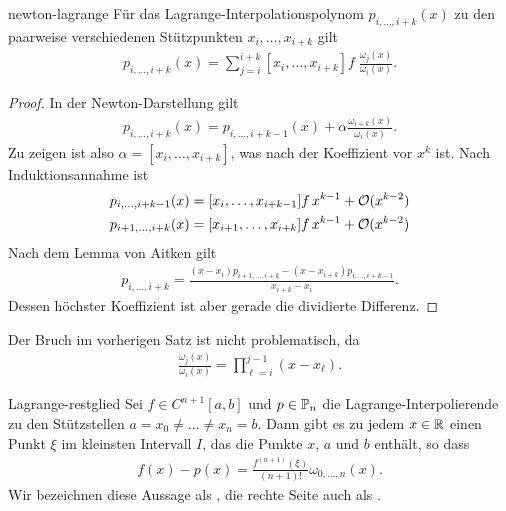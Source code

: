 \begin{Satz}{newton-lagrange}
  Für das Lagrange-Interpolationspolynom $p_{i,\dots,i+k}(x)$ zu den
  paarweise verschiedenen Stützpunkten $x_i,\dots,x_{i+k}$ gilt
  \begin{gather}
    p_{i,\dots,i+k}(x)
    = \sum_{j=i}^{i+k} [x_i,\dots,x_{i+k}]f\; \frac{\omega_j(x)}{\omega_i(x)}.
  \end{gather}
\end{Satz}

\begin{proof}
  In der Newton-Darstellung gilt
  \begin{gather}
    p_{i,\dots,i+k}(x) = p_{i,\dots,i+k-1}(x)
    + \alpha \frac{\omega_{i+k}(x)}{\omega_i(x)}.
  \end{gather}
  Zu zeigen ist also $\alpha = [x_i,\dots,x_{i+k}]$, was nach
   der Koeffizient vor $x^k$ ist. Nach
  Induktionsannahme ist
  \begin{gather}
    \begin{split}
      p_{i,\dots,i+k-1}(x) &= [x_i,\dots,x_{i+k-1}]f \,x^{k-1} +\bigo(x^{k-2})\\
      p_{i+1,\dots,i+k}(x) &= [x_{i+1},\dots,x_{i+k}]f \,x^{k-1} +\bigo(x^{k-2})
    \end{split}
  \end{gather}
  Nach dem Lemma von Aitken gilt
  \begin{gather}
    p_{i,\dots,i+k} = \frac{(x-x_i)p_{i+1,\dots,i+k}
      - (x-x_{i+k})p_{i,\dots,i+k-1}}{x_{i+k} - x_i}.
  \end{gather}
  Dessen höchster Koeffizient ist aber gerade die dividierte Differenz.
\end{proof}

\begin{remark}
  Der Bruch im vorherigen Satz ist nicht problematisch, da
  \begin{gather}
    \frac{\omega_j(x)}{\omega_i(x)} = \prod_{\ell=i}^{j-1} (x-x_\ell).
  \end{gather}
\end{remark}

\begin{Satz}{Lagrange-restglied}
  Sei $f \in C^{n+1}[a,b]$ und $p\in \P_n$ die
  Lagrange-Interpolierende zu den Stützstellen
  $a=x_0\neq\dots\neq x_n=b$. Dann gibt es zu jedem $x\in \R$ einen Punkt
  $\xi$ im kleinsten Intervall $I$, das die Punkte $x$, $a$ und $b$
  enthält, so dass
  \begin{gather}
    f(x)- p(x) = \frac{f^{(n+1)}(\xi)}{(n+1)!} \omega_{0,\dots,n}(x).
  \end{gather}
  Wir bezeichnen diese Aussage als , die
  rechte Seite auch als .
\end{Satz}

